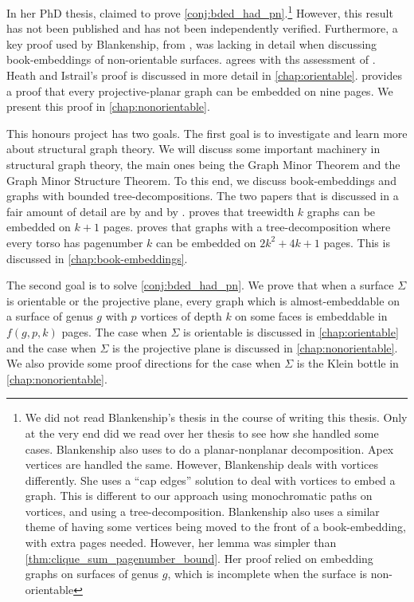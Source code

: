 In her PhD thesis, \textcite{Blankenship-PhD03} claimed to prove \cref{conj:bded_had_pn}.\footnote{
	We did not read Blankenship's thesis in the course of writing this thesis. Only at the very end did we read over her thesis to see how she handled some cases. 
	Blankenship also uses \textcite{heathPagenumberGenusGraphs1992} to do a planar-nonplanar decomposition. Apex vertices are handled the same. However, Blankenship deals with vortices differently. She uses a ``cap edges'' solution to deal with vortices to embed a graph. This is different to our approach using monochromatic paths on vortices, and using a tree-decomposition. 
	Blankenship also uses a similar theme of having some vertices being moved to the front of a book-embedding, with extra pages needed. However, her lemma was simpler than \cref{thm:clique_sum_pagenumber_bound}. Her proof relied on \textcite{heathPagenumberGenusGraphs1992} embedding graphs on surfaces of genus $g$, which is incomplete when the surface is non-orientable  
} However, this result has not been published and has not been independently verified. Furthermore, a key proof used by Blankenship, from \textcite{heathPagenumberGenusGraphs1992}, was lacking in detail when discussing book-embeddings of non-orientable surfaces. \textcite{nakamotoBookEmbeddingProjectiveplanar2015} agrees with ths assessment of \textcite{heathPagenumberGenusGraphs1992}. Heath and Istrail's proof is discussed in more detail in \cref{chap:orientable}. \textcite{nakamotoBookEmbeddingProjectiveplanar2015} provides a proof that every projective-planar graph can be embedded on nine pages. We present this proof in \cref{chap:nonorientable}. 

This honours project has two goals. The first goal is to investigate and learn more about structural graph theory. We will discuss some important machinery in structural graph theory, the main ones being the Graph Minor Theorem and the Graph Minor Structure Theorem. To this end, we discuss book-embeddings and graphs with bounded tree-decompositions. The two papers that is discussed in a fair amount of detail are by \textcite{hickingbothamStackNumberCliqueSum2023} and by \textcite{ganleyPagenumberTrees2001}. \textcite{ganleyPagenumberTrees2001} proves that treewidth $k$ graphs can be embedded on $k+1$ pages. \textcite{hickingbothamStackNumberCliqueSum2023} proves that graphs with a tree-decomposition where every torso has pagenumber $k$ can be embedded on $2k^2 + 4k + 1$ pages. This is discussed in \cref{chap:book-embeddings}.

The second goal is to solve \cref{conj:bded_had_pn}. We prove that when a surface $\Sigma$ is orientable or the projective plane, every graph which is almost-embeddable on a surface of genus $g$ with $p$ vortices of depth $k$ on some faces is embeddable in $f(g, p, k)$ pages. The case when $\Sigma$ is orientable is discussed in \cref{chap:orientable} and the case when $\Sigma$ is the projective plane is discussed in \cref{chap:nonorientable}. We also provide some proof directions for the case when $\Sigma$ is the Klein bottle in \cref{chap:nonorientable}. 

